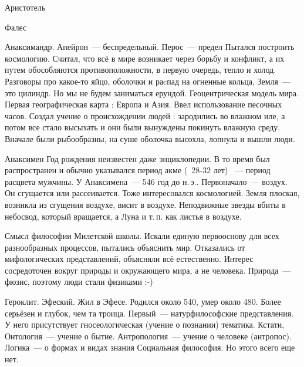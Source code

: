 
Аристотель

Фалес

Анаксимандр. 
Апейрон~--- беспредельный. Перос~--- предел
Пытался построить космологию. Считал, что всё в мире возникает через борьбу и конфликт, а их путем обособляются противоположности, в первую очередь, тепло и холод. 
Разговоры про какое-то яйцо, оболочки и раcпад на огненные кольца, Земля~--- это цилиндр. 
Но мы не будем заниматься ерундой. 
Геоцентрическая модель мира. Первая географическая карта : Европа и Азия. Ввел использование песочных часов. 
Создал учение о происхождении людей : зародились во влажном иле, а потом все стало высыхать и они были вынуждены покинуть влажную среду. Вначале были рыбообразны, на суше оболочка высохла, лопнула и вышли люди. 

Анаксимен
Год рождения неизвестен даже энциклопедии. 
В то время был распространен и обычно указывался период акме (~28-32 лет) ~--- период расцвета мужчины. 
У Анаксимена~--- 546 год до н.\,э.. 
Первоначало~--- воздух. Он сгущается или рассеивается. 
Тоже интересовался космологией. Земля плоская, возникла из сгущения воздухе, висит в воздухе. 
Неподвижные звезды вбиты в небосвод, который вращается, а Луна и т.\,п. как листья в воздухе. 

Смысл философии Милетской школы. 
Искали единую первооснову для всех разнообразных процессов, пытались объяснить мир. 
Отказались от мифологических представлений, объясняли всё естественно. 
Интерес сосредоточен вокруг природы и окружающего мира, а не человека. Природа~--- фюзис, поэтому люди стали физиками :-) 

Героклит. Эфеский.
Жил в Эфесе. Родился около 540, умер около 480. Более серьёзен и глубок, чем та троица. 
Первый~--- натурфилософские представления. У него присутствует гносеологическая (учение о познании) тематика. 
Кстати, 
Онтология~--- учение о бытие. 
Антропология~--- учение о человеке (антропос).
Логика~--- о формах и видах знания
Социальная философия. Но этого всего еще нет. 

